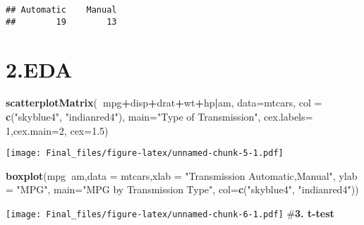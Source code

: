 \documentclass[]{article}
\newenvironment{Shaded}{\begin{snugshade}}{\end{snugshade}}
\newcommand{\KeywordTok}[1]{\textcolor[rgb]{0.13,0.29,0.53}{\textbf{#1}}}
\newcommand{\DataTypeTok}[1]{\textcolor[rgb]{0.13,0.29,0.53}{#1}}
\newcommand{\DecValTok}[1]{\textcolor[rgb]{0.00,0.00,0.81}{#1}}
\newcommand{\FloatTok}[1]{\textcolor[rgb]{0.00,0.00,0.81}{#1}}
\newcommand{\StringTok}[1]{\textcolor[rgb]{0.31,0.60,0.02}{#1}}
\newcommand{\OperatorTok}[1]{\textcolor[rgb]{0.81,0.36,0.00}{\textbf{#1}}}
\newcommand{\NormalTok}[1]{#1}
\begin{document}
\begin{verbatim}
## Automatic    Manual 
##        19        13
\end{verbatim}

\section{\texorpdfstring{\textbf{2.EDA}}{2.EDA}}\label{eda}

\begin{Shaded}
\begin{Highlighting}[]
\KeywordTok{scatterplotMatrix}\NormalTok{(}\OperatorTok{~}\NormalTok{mpg}\OperatorTok{+}\NormalTok{disp}\OperatorTok{+}\NormalTok{drat}\OperatorTok{+}\NormalTok{wt}\OperatorTok{+}\NormalTok{hp}\OperatorTok{|}\NormalTok{am, }\DataTypeTok{data=}\NormalTok{mtcars, }\DataTypeTok{col =} \KeywordTok{c}\NormalTok{(}\StringTok{"skyblue4"}\NormalTok{, }\StringTok{"indianred4"}\NormalTok{), }\DataTypeTok{main=}\StringTok{"Type of Transmission"}\NormalTok{, }\DataTypeTok{cex.labels=} \DecValTok{1}\NormalTok{,}\DataTypeTok{cex.main=}\DecValTok{2}\NormalTok{, }\DataTypeTok{cex=}\FloatTok{1.5}\NormalTok{)}
\end{Highlighting}
\end{Shaded}

\texttt{[image: Final\_files/figure-latex/unnamed-chunk-5-1.pdf]}

\begin{Shaded}
\begin{Highlighting}[]
\KeywordTok{boxplot}\NormalTok{(mpg}\OperatorTok{~}\NormalTok{am,}\DataTypeTok{data =}\NormalTok{ mtcars,}\DataTypeTok{xlab =} \StringTok{"Transmission Automatic,Manual"}\NormalTok{, }\DataTypeTok{ylab =} \StringTok{"MPG"}\NormalTok{, }\DataTypeTok{main=}\StringTok{"MPG by Transmission Type"}\NormalTok{, }\DataTypeTok{col=}\KeywordTok{c}\NormalTok{(}\StringTok{"skyblue4"}\NormalTok{, }\StringTok{"indianred4"}\NormalTok{))}
\end{Highlighting}
\end{Shaded}

\texttt{[image: Final\_files/figure-latex/unnamed-chunk-6-1.pdf]}
\#\textbf{3. t-test}

\begin{Shaded}
\end{Shaded}
\end{document}
